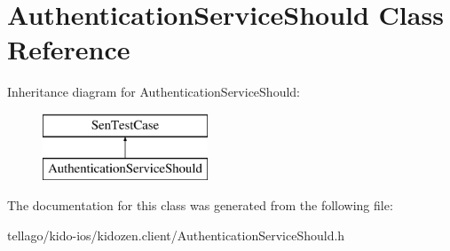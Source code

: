\hypertarget{interface_authentication_service_should}{\section{Authentication\-Service\-Should Class Reference}
\label{interface_authentication_service_should}
}
Inheritance diagram for Authentication\-Service\-Should\-:\begin{figure}[H]
\begin{center}
\leavevmode
\includegraphics[height=2.000000cm]{interface_authentication_service_should}
\end{center}
\end{figure}


The documentation for this class was generated from the following file\-:\begin{DoxyCompactItemize}
\item 
tellago/kido-\/ios/kidozen.\-client/Authentication\-Service\-Should.\-h\end{DoxyCompactItemize}

